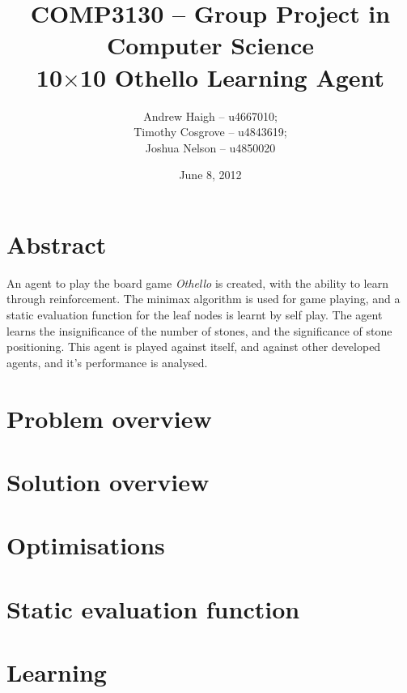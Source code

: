 \documentclass[11pt,twocolumn]{article}
\title{COMP3130 -- Group Project in Computer Science\\ 10$\times$10 Othello Learning Agent}
\date{June 8, 2012}
\author{Andrew Haigh -- u4667010;\\ Timothy Cosgrove -- u4843619;\\ Joshua Nelson -- u4850020}
\begin{document}
\onecolumn
\maketitle
\clearpage
\section{Abstract}
An agent to play the board game \emph{Othello} is created, with the ability to learn through reinforcement. The minimax algorithm is used for game playing, and a static evaluation function for the leaf nodes is learnt by self play. The agent learns the insignificance of the number of stones, and the significance of stone positioning. This agent is played against itself, and against other developed agents, and it's performance is analysed.

\section{Problem overview}
\section{Solution overview}
\section{Optimisations}
\section{Static evaluation function}
\clearpage
\section{Learning}
\end{document}
